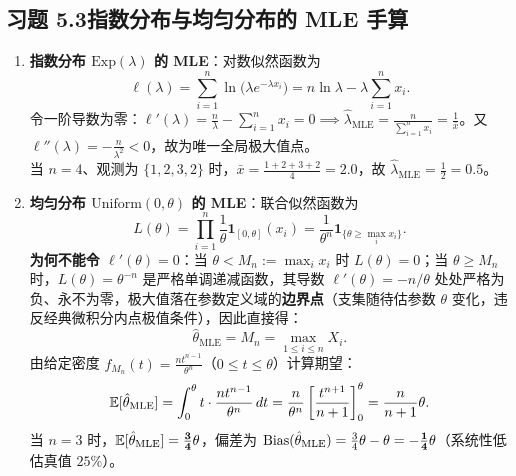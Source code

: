 \subsection*{习题 5.3\quad 指数分布与均匀分布的 MLE 手算}
\begin{enumerate}[label=(\alph*), leftmargin=1.8em]
  \item \textbf{指数分布 $\mathrm{Exp}(\lambda)$ 的 MLE}：对数似然函数为
  \[
    \ell(\lambda) = \sum_{i=1}^n \ln\bigl(\lambda e^{-\lambda x_i}\bigr) = n\ln\lambda - \lambda\sum_{i=1}^n x_i.
  \]
  令一阶导数为零：$\ell'(\lambda) = \frac{n}{\lambda} - \sum_{i=1}^n x_i = 0 \implies \hat{\lambda}_{\mathrm{MLE}} = \frac{n}{\sum_{i=1}^n x_i} = \frac{1}{\bar{x}}$。又 $\ell''(\lambda) = -\frac{n}{\lambda^2} < 0$，故为唯一全局极大值点。\\
  当 $n=4$、观测为 $\{1, 2, 3, 2\}$ 时，$\bar{x} = \frac{1+2+3+2}{4} = 2.0$，故 $\hat{\lambda}_{\mathrm{MLE}} = \frac{1}{2} = \mathbf{0.5}$。
  \item \textbf{均匀分布 $\mathrm{Uniform}(0, \theta)$ 的 MLE}：联合似然函数为
  \[
    L(\theta) = \prod_{i=1}^n \frac{1}{\theta}\mathbf{1}_{[0,\theta]}(x_i)
              = \frac{1}{\theta^n}\mathbf{1}_{\{\theta \ge \max_i x_i\}}.
  \]
  \textbf{为何不能令 $\ell'(\theta) = 0$}：当 $\theta < M_n := \max_i x_i$ 时 $L(\theta) = 0$；当 $\theta \ge M_n$ 时，$L(\theta) = \theta^{-n}$ 是严格单调递减函数，其导数 $\ell'(\theta) = -n/\theta$ 处处严格为负、永不为零，极大值落在参数定义域的\textbf{边界点}（支集随待估参数 $\theta$ 变化，违反经典微积分内点极值条件），因此直接得：
  \[
    \hat{\theta}_{\mathrm{MLE}} = M_n = \max_{1\le i\le n} X_i.
  \]
  由给定密度 $f_{M_n}(t) = \frac{n t^{n-1}}{\theta^n}$（$0 \le t \le \theta$）计算期望：
  \[
    \mathbb{E}[\hat{\theta}_{\mathrm{MLE}}] = \int_0^\theta t\cdot\frac{n t^{n-1}}{\theta^n}\,dt
    = \frac{n}{\theta^n}\left[\frac{t^{n+1}}{n+1}\right]_0^\theta = \frac{n}{n+1}\theta.
  \]
  当 $n = 3$ 时，$\mathbb{E}[\hat{\theta}_{\mathrm{MLE}}] = \mathbf{\frac{3}{4}\theta}$，偏差为 $\operatorname{Bias}(\hat{\theta}_{\mathrm{MLE}}) = \frac{3}{4}\theta - \theta = \mathbf{-\frac{1}{4}\theta}$（系统性低估真值 $25\%$）。
\end{enumerate}

